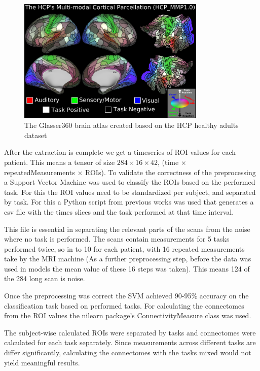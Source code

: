 	\begin{figure}[!h]
		\centering
		\includegraphics[width=0.8\textwidth]{figures/atlas.png}
		\caption{The Glasser360 brain atlas created based on the HCP healthy adults dataset\cite{sporns2005human}}
	\end{figure}

	After the extraction is complete we get a timeseries of ROI values for each patient. This means a tensor of size $284 \times 16 \times 42$, (time $\times$ repeatedMeasurements $\times$ ROIs). To validate the correctness of the preprocessing a Support Vector Machine was used to classify the ROIs based on the performed task. For this the ROI values need to be standardized per subject, and separated by task. For this a Python script from previous works was used that generates a csv file with the times slices and the task performed at that time interval. 
	
	This file is essential in separating the relevant parts of the scans from the noise where no task is performed. The scans contain measurements for 5 tasks performed twice, so in to 10 for
	each patient, with 16 repeated measurements take by the MRI machine (As a further preprocessing step, before the data was used in models the mean value of these 16 steps was taken). This means 124 of the 284 long
	scan is noise.
	
	Once the preprocessing was correct the SVM achieved 90-95\% accuracy on the classification task based on performed tasks. For calculating the connectomes from the ROI values the nilearn package’s ConnectivityMeasure class was used. 
	
	The subject-wise calculated ROIs were separated by tasks and connectomes were calculated for each task separately. Since measurements across different tasks are differ significantly, calculating the connectomes with the tasks mixed would not yield meaningful results.
	
